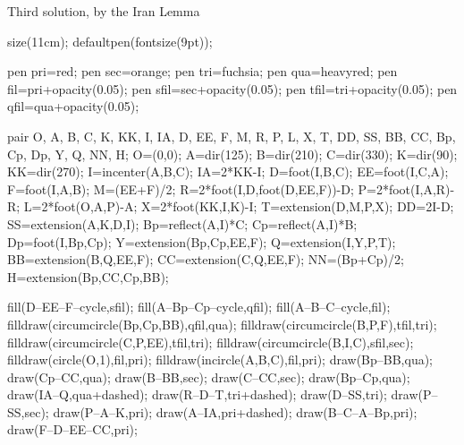 \begin{customenv}{Third solution, by the Iran Lemma}\
    \begin{center}
        \begin{asy}
            size(11cm);
            defaultpen(fontsize(9pt));

            pen pri=red;
            pen sec=orange;
            pen tri=fuchsia;
            pen qua=heavyred;
            pen fil=pri+opacity(0.05);
            pen sfil=sec+opacity(0.05);
            pen tfil=tri+opacity(0.05);
            pen qfil=qua+opacity(0.05);

            pair O, A, B, C, K, KK, I, IA, D, EE, F, M, R, P, L, X, T, DD, SS, BB, CC, Bp, Cp, Dp, Y, Q, NN, H;
            O=(0,0);
            A=dir(125);
            B=dir(210);
            C=dir(330);
            K=dir(90);
            KK=dir(270);
            I=incenter(A,B,C);
            IA=2*KK-I;
            D=foot(I,B,C);
            EE=foot(I,C,A);
            F=foot(I,A,B);
            M=(EE+F)/2;
            R=2*foot(I,D,foot(D,EE,F))-D;
            P=2*foot(I,A,R)-R;
            L=2*foot(O,A,P)-A;
            X=2*foot(KK,I,K)-I;
            T=extension(D,M,P,X);
            DD=2I-D;
            SS=extension(A,K,D,I);
            Bp=reflect(A,I)*C;
            Cp=reflect(A,I)*B;
            Dp=foot(I,Bp,Cp);
            Y=extension(Bp,Cp,EE,F);
            Q=extension(I,Y,P,T);
            BB=extension(B,Q,EE,F);
            CC=extension(C,Q,EE,F);
            NN=(Bp+Cp)/2;
            H=extension(Bp,CC,Cp,BB);

            fill(D--EE--F--cycle,sfil);
            fill(A--Bp--Cp--cycle,qfil);
            fill(A--B--C--cycle,fil);
            filldraw(circumcircle(Bp,Cp,BB),qfil,qua);
            filldraw(circumcircle(B,P,F),tfil,tri);
            filldraw(circumcircle(C,P,EE),tfil,tri);
            filldraw(circumcircle(B,I,C),sfil,sec);
            filldraw(circle(O,1),fil,pri);
            filldraw(incircle(A,B,C),fil,pri);
            draw(Bp--BB,qua);
            draw(Cp--CC,qua);
            draw(B--BB,sec);
            draw(C--CC,sec);
            draw(Bp--Cp,qua);
            draw(IA--Q,qua+dashed);
            draw(R--D--T,tri+dashed);
            draw(D--SS,tri);
            draw(P--SS,sec);
            draw(P--A--K,pri);
            draw(A--IA,pri+dashed);
            draw(B--C--A--Bp,pri);
            draw(F--D--EE--CC,pri);


\end{asy}
\end{center}
\end{customenv}
